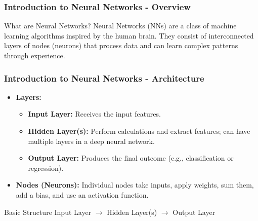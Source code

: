 \documentclass[aspectratio=169]{beamer}
\begin{document}
\begin{frame}[fragile]
    \frametitle{Introduction to Neural Networks - Overview}
    \begin{block}{What are Neural Networks?}
        Neural Networks (NNs) are a class of machine learning algorithms inspired by the human brain. 
        They consist of interconnected layers of nodes (neurons) that process data and can learn complex patterns through experience.
    \end{block}
\end{frame}

\begin{frame}[fragile]
    \frametitle{Introduction to Neural Networks - Architecture}
    \begin{itemize}
        \item \textbf{Layers:}
            \begin{itemize}
                \item \textbf{Input Layer:} Receives the input features.
                \item \textbf{Hidden Layer(s):} Perform calculations and extract features; can have multiple layers in a deep neural network.
                \item \textbf{Output Layer:} Produces the final outcome (e.g., classification or regression).
            \end{itemize}
        \item \textbf{Nodes (Neurons):} Individual nodes take inputs, apply weights, sum them, add a bias, and use an activation function.
    \end{itemize}
    \begin{block}{Basic Structure}
        Input Layer $\rightarrow$ Hidden Layer(s) $\rightarrow$ Output Layer
    \end{block}
\end{frame}
\end{document}
